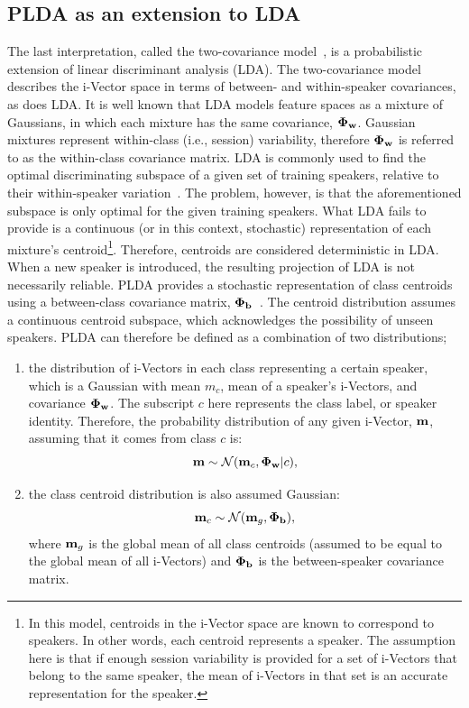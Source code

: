 \subsection{PLDA as an extension to LDA}
\label{sec:twocov}
The last interpretation, called the two-covariance model~\cite{sizov2014unifying}, is a probabilistic extension of linear discriminant analysis (LDA). 
The two-covariance model describes the i-Vector space in terms of between- and within-speaker covariances, as does LDA. 
It is well known that LDA models feature spaces as a mixture of Gaussians, in which each mixture has the same covariance, ${\bf \Phi_w}$. 
Gaussian mixtures represent within-class (i.e., session) variability, therefore ${\bf \Phi_w}$ is referred to as the within-class covariance matrix. 
LDA is commonly used to find the optimal discriminating subspace of a given set of training speakers, relative to their within-speaker variation~\cite{ioffePLDA2006}. 
The problem, however, is that the aforementioned subspace is only optimal for the given training speakers. 
What LDA fails to provide is a continuous (or in this context, stochastic) representation of each mixture's centroid\footnote{In this model, centroids in the i-Vector space are known to correspond to speakers. In other words, each centroid represents a speaker. The assumption here is that if enough session variability is provided for a set of i-Vectors that belong to the same speaker, the mean of i-Vectors in that set is an accurate representation for the speaker.}. 
Therefore, centroids are considered deterministic in LDA. 
When a new speaker is introduced, the resulting projection of LDA is not necessarily reliable. 
PLDA provides a stochastic representation of class centroids using a between-class covariance matrix, ${\bf \Phi_b}$~\cite{ioffePLDA2006}. 
The centroid distribution assumes a continuous centroid subspace, which acknowledges the possibility of unseen speakers. 
PLDA can therefore be defined as a combination of two distributions; 
\begin{enumerate}
	\item the distribution of i-Vectors in each class representing a certain speaker, which is a Gaussian with mean $m_c$, mean of a speaker's i-Vectors, and covariance ${\bf \Phi_w}$. The subscript $c$ here represents the class label, or speaker identity. Therefore, the probability distribution of any given i-Vector, ${\bf m}$, assuming that it comes from class $c$ is:
	\begin{equation}
	\label{eq:within_spk_dist}
	{\bf m} \sim \mathcal{N} ({\bf m}_c,{\bf \Phi_w} | c),
	\end{equation}
	\item the class centroid distribution is also assumed Gaussian:
	\begin{equation}
	\label{eq:between_spk_dist}
	{\bf m}_c \sim \mathcal{N} ({\bf m}_g,{\bf \Phi_b}),
	\end{equation}
	where ${\bf m}_g$ is the global mean of all class centroids (assumed to be equal to the global mean of all i-Vectors) and ${\bf \Phi_b}$ is the between-speaker covariance matrix. 
\end{enumerate}

